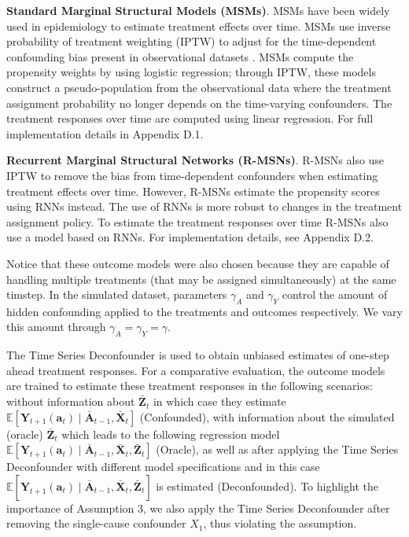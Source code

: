 \documentclass{article}
\newcommand{\vc}[1]{\mathbf{#1}}
\newcommand{\hist}[1]{\bar{\vc{#1}}}
\begin{document}
	\textbf{Standard Marginal Structural Models (MSMs)}. MSMs \citep{robins2000marginal, hernan2001marginal} have been widely used in epidemiology to estimate treatment effects over time. MSMs use inverse probability of treatment weighting (IPTW) to adjust for the time-dependent confounding bias present in observational datasets \cite{mansournia2017handling, bica2020real}. MSMs compute the propensity weights by using logistic regression; through IPTW, these models construct a pseudo-population from the observational data where the treatment assignment probability no longer depends on the time-varying confounders. The treatment responses over time are computed using linear regression. For full implementation details in Appendix D.1. 

	\textbf{Recurrent Marginal Structural Networks (R-MSNs)}. R-MSNs \citep{lim2018forecasting}  also use IPTW to remove the bias from time-dependent confounders when estimating treatment effects over time. However, R-MSNs  estimate the propensity scores using RNNs instead. The use of RNNs is more robust to changes in the treatment assignment policy. To estimate the treatment responses over time R-MSNs also use a model based on RNNs. For implementation details, see Appendix D.2. 
	
	Notice that these outcome models were also chosen because they are capable of handling multiple treatments (that may be assigned simultaneously) at the same timstep. In the simulated dataset, parameters $\gamma_A$ and $\gamma_Y$ control the amount of hidden confounding applied to the treatments  and outcomes respectively. We vary this amount through $\gamma_A = \gamma_Y = \gamma $. 
	
	The Time Series Deconfounder is used to obtain unbiased estimates of one-step ahead treatment responses. For a comparative evaluation, the outcome models are trained to estimate these treatment responses in the following scenarios:  without information about $\hist{Z}_t$ in which case they estimate $\mathbb{E}[\vc{Y}_{t+1}(\vc{a}_t)\mid \hist{A}_{t-1}, \hist{X}_t]$ (Confounded), with information about the simulated (oracle) $\hist{Z}_t$ which leads to the following regression model $\mathbb{E}[\vc{Y}_{t+1}(\vc{a}_t)\mid \hist{A}_{t-1}, \hist{X}_t, \hist{Z}_t]$ (Oracle), as well as after applying the Time Series Deconfounder with different model specifications and in this case $\mathbb{E}[\vc{Y}_{t+1}(\vc{a}_t)\mid \hist{A}_{t-1}, \hist{X}_t, \hat{\hist{Z}}_t]$ is estimated (Deconfounded). To highlight the importance of Assumption 3, we also apply the Time Series Deconfounder after removing the single-cause confounder $X_1$, thus violating the assumption.  
	
\end{document}

